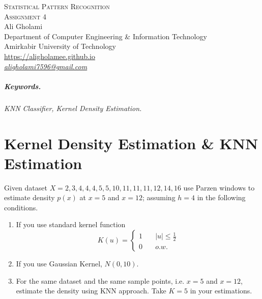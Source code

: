 \documentclass[12pt]{article}
\numberwithin{equation}{section}
\numberwithin{table}{section}
\numberwithin{figure}{section}
\begin{document}

\begin{center}
\textsc{\Large Statistical Pattern Recognition} \\[2pt]
	\textsc{\large Assignment 4}\\
	\vspace{0.5cm}
  Ali Gholami \\[6pt]
  Department of Computer Engineering \& Information Technology\\
  Amirkabir University of Technology  \\[6pt]
  \def\UrlFont{\em}
  \url{https://aligholamee.github.io}\\
    \href{mailto:aligholami7596@gmail.com}{\textit{aligholami7596@gmail.com}}
\end{center}

\begin{abstract}

\end{abstract}

\subparagraph{Keywords.} \textit{KNN Classifier, Kernel Density Estimation.}

\section{Kernel Density Estimation \& KNN Estimation}
Given dataset $ X = 2, 3, 4, 4, 4, 5, 5, 10, 11, 11, 11, 12, 14, 16 $ use Parzen windows to estimate density $p(x)$ at $x = 5$ and $x = 12$; assuming $h = 4$ in the following conditions.
\begin{enumerate}[label=(\alph*)]
	\item If you use standard kernel function
	\[ K(u) =
	\begin{cases}
	1      & \quad |u| \leq \frac{1}{2}\\
	0  & \quad o.w.
	\end{cases}
	\]


	\item If you use Gaussian Kernel, $N(0, 10)$.
	
	\item For the same dataset and the same sample points, i.e. $x = 5$ and $x = 12$, estimate the density using KNN approach. Take $ K = 5$ in your estimations.

\end{enumerate}
\end{document}
